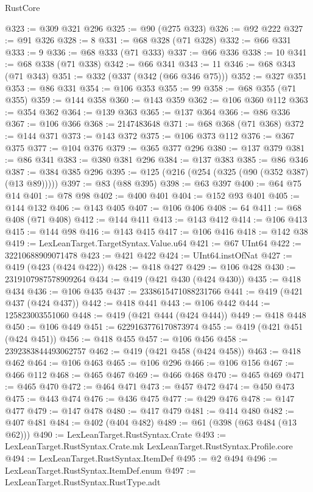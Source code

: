 \begin{lexlean}{RustCore}
\begin{coremodule}
@323 := @309 @321 @296
@325 := @90 (@275 @323)
@326 := @92 @222
@327 := @91 @326
@328 := 8
@331 := @68 @328 (@71 @328)
@332 := @66 @331
@333 := 9
@336 := @68 @333 (@71 @333)
@337 := @66 @336
@338 := 10
@341 := @68 @338 (@71 @338)
@342 := @66 @341
@343 := 11
@346 := @68 @343 (@71 @343)
@351 := @332 (@337 (@342 (@66 @346 @75)))
@352 := @327 @351
@353 := @86 @331
@354 := @106 @353
@355 := 99
@358 := @68 @355 (@71 @355)
@359 := @144 @358
@360 := @143 @359
@362 := @106 @360 @112
@363 := @354 @362
@364 := @139 @363
@365 := @137 @364
@366 := @86 @336
@367 := @106 @366
@368 := 2147483648
@371 := @68 @368 (@71 @368)
@372 := @144 @371
@373 := @143 @372
@375 := @106 @373 @112
@376 := @367 @375
@377 := @104 @376
@379 := @365 @377 @296
@380 := @137 @379
@381 := @86 @341
@383 := @380 @381 @296
@384 := @137 @383
@385 := @86 @346
@387 := @384 @385 @296
@395 := @125 (@216 (@254 (@325 (@90 (@352 @387) (@13 @89)))))
@397 := @83 (@88 @395)
@398 := @63 @397
@400 := @64 @75 @14
@401 := @78 @98
@402 := @400 @401
@404 := @152 @93 @401
@405 := @144 @132
@406 := @143 @405
@407 := @106 @406
@408 := 64
@411 := @68 @408 (@71 @408)
@412 := @144 @411
@413 := @143 @412
@414 := @106 @413
@415 := @144 @98
@416 := @143 @415
@417 := @106 @416
@418 := @142 @38
@419 := LexLeanTarget.TargetSyntax.Value.u64
@421 := @67 UInt64
@422 := 32210688909071478
@423 := @421 @422
@424 := UInt64.instOfNat
@427 := @419 (@423 (@424 @422))
@428 := @418 @427
@429 := @106 @428
@430 := 2319107987578909264
@434 := @419 (@421 @430 (@424 @430))
@435 := @418 @434
@436 := @106 @435
@437 := 2338615471088231766
@441 := @419 (@421 @437 (@424 @437))
@442 := @418 @441
@443 := @106 @442
@444 := 125823003551060
@448 := @419 (@421 @444 (@424 @444))
@449 := @418 @448
@450 := @106 @449
@451 := 6229163776170873974
@455 := @419 (@421 @451 (@424 @451))
@456 := @418 @455
@457 := @106 @456
@458 := 2392383844493062757
@462 := @419 (@421 @458 (@424 @458))
@463 := @418 @462
@464 := @106 @463
@465 := @106 @296
@466 := @106 @156
@467 := @466 @112
@468 := @465 @467
@469 := @466 @468
@470 := @465 @469
@471 := @465 @470
@472 := @464 @471
@473 := @457 @472
@474 := @450 @473
@475 := @443 @474
@476 := @436 @475
@477 := @429 @476
@478 := @147 @477
@479 := @147 @478
@480 := @417 @479
@481 := @414 @480
@482 := @407 @481
@484 := @402 (@404 @482)
@489 := @61 (@398 (@63 @484 (@13 @62)))
@490 := LexLeanTarget.RustSyntax.Crate
@493 := LexLeanTarget.RustSyntax.Crate.mk LexLeanTarget.RustSyntax.Profile.core
@494 := LexLeanTarget.RustSyntax.ItemDef
@495 := @2 @494
@496 := LexLeanTarget.RustSyntax.ItemDef.enum
@497 := LexLeanTarget.RustSyntax.RustType.adt

\end{coremodule}
\end{lexlean}
